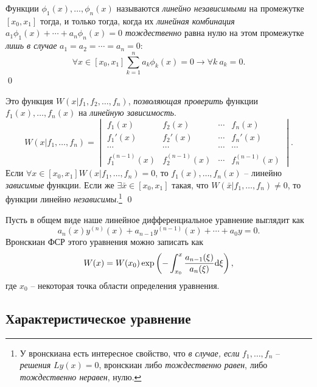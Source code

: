\documentclass[12pt]{report}
\begin{document}
\begin{defn}
	Функции $\phi_1(x), \dots, \phi_n(x)$ называются \emph{линейно независимыми} на промежутке $[x_0,x_1]$ тогда, и только тогда, когда их \emph{линейная комбинация} ${a_1\phi_1(x) + \cdots + a_n\phi_n(x) = 0}$ \emph{тождественно} равна нулю на этом промежутке \emph{лишь в случае} ${a_1=a_2=\cdots=a_n=0}$:
	\[
		\forall x\in[x_0,x_1]\sum_{k=1}^n a_k\phi_k(x) = 0 \rightarrow \forall k~a_k=0.
	\] \qed
\end{defn}
\begin{defn}\label{def:Wronskian}
	Это функция $W(x| f_1, f_2, \dots, f_n)$, \emph{позволяющая проверить} функции $f_1(x), \dots, f_n(x)$ на \emph{линейную зависимость}.
	\[
		W(x|f_1,\dots,f_n) = 
			\begin{vmatrix}
				f_1(x)         & f_2(x)         & \cdots & f_n(x)         \\
				f_1'(x)        & f_2'(x)        & \cdots & f_n'(x)        \\
				\cdots         & \cdots         & \cdots & \cdots         \\
				f_1^{(n-1)}(x) & f_2^{(n-1)}(x) & \cdots & f_n^{(n-1)}(x)
			\end{vmatrix}.
	\]
	Если $\forall x\in[x_0, x_1] W(x| f_1, \dots, f_n) = 0$, то $f_1(x), \dots, f_n(x)$ -- линейно \emph{зависимые} функции. Если же $\exists \bar x\in [x_0, x_1]$ такая, что $W(\bar x| f_1,\dots,f_n) \neq 0$, то функции линейно \emph{независимы}.\footnote{У вронскиана есть интересное свойство, что \emph{в случае, если} $f_1,\dots,f_n$ -- \emph{решения} $Ly(x)=0$, вронскиан либо \emph{тождественно равен}, либо \emph{тождественно неравен}, нулю.} \qed
\end{defn}
\begin{defn}
	Пусть в общем виде наше линейное дифференциальное уравнение выглядит как 
	\[
		a_n(x)y^{(n)}(x) + a_{n-1}y^{(n-1)}(x) + \cdots + a_0y = 0.
	\]
	Вронскиан ФСР этого уравнения можно записать как
	\[
		W(x) = W(x_0)\exp\left(-\int_{x_0}^{x} \frac{a_{n-1}(\xi)}{a_n(\xi)} \mathrm d\xi\right),
	\]
	где $x_0$ -- некоторая точка области определения уравнения.
\end{defn}


\subsection{Характеристическое уравнение}\label{sec:characteristic-equation}
\end{document}
